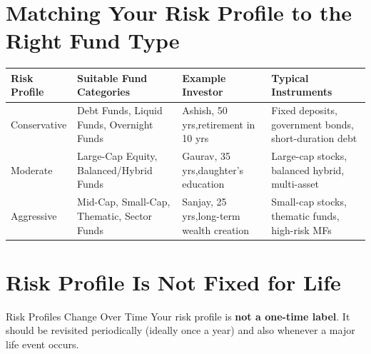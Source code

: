 \documentclass[12pt,a4paper]{article}
\begin{document}
\section{Matching Your Risk Profile to the Right Fund Type}

\begin{center}
\begin{tabular}{B{2.8cm} L{3.2cm} L{3.2cm} L{4.2cm}}
\toprule
\textbf{Risk Profile} & \textbf{Suitable Fund Categories} & \textbf{Example Investor} & \textbf{Typical Instruments}\\
\midrule
{}
Conservative
& Debt Funds, Liquid Funds, Overnight Funds
& Ashish, 50 yrs,\newline retirement in 10 yrs
& Fixed deposits, government bonds, short-duration debt\\[6pt]

Moderate
& Large-Cap Equity, Balanced/Hybrid Funds
& Gaurav, 35 yrs,\newline daughter's education
& Large-cap stocks, balanced hybrid, multi-asset\\[6pt]

Aggressive
& Mid-Cap, Small-Cap, Thematic, Sector Funds
& Sanjay, 25 yrs,\newline long-term wealth creation
& Small-cap stocks, thematic funds, high-risk MFs\\
\bottomrule
\end{tabular}
\end{center}

\section{Risk Profile Is Not Fixed for Life}

\begin{conceptbox}{Risk Profiles Change Over Time}
Your risk profile is \textbf{not a one-time label}. It should be revisited periodically (ideally once a year) and also whenever a major life event occurs.
\end{conceptbox}
\end{document}
